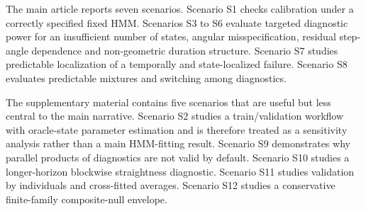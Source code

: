\documentclass[pdflatex,sn-basic]{sn-jnl}
\theoremstyle{thmstyleone}
\theoremstyle{thmstyletwo}
\theoremstyle{thmstylethree}
\newcommand{\1}{\mathbf 1}
\begin{document}
The main article reports seven scenarios. Scenario S1 checks calibration under a correctly specified fixed HMM. Scenarios S3 to S6 evaluate targeted diagnostic power for an insufficient number of states, angular misspecification, residual step-angle dependence and non-geometric duration structure. Scenario S7 studies predictable localization of a temporally and state-localized failure. Scenario S8 evaluates predictable mixtures and switching among diagnostics.

The supplementary material contains five scenarios that are useful but less central to the main narrative. Scenario S2 studies a train/validation workflow with oracle-state parameter estimation and is therefore treated as a sensitivity analysis rather than a main HMM-fitting result. Scenario S9 demonstrates why parallel products of diagnostics are not valid by default. Scenario S10 studies a longer-horizon blockwise straightness diagnostic. Scenario S11 studies validation by individuals and cross-fitted averages. Scenario S12 studies a conservative finite-family composite-null envelope.
\end{document}
